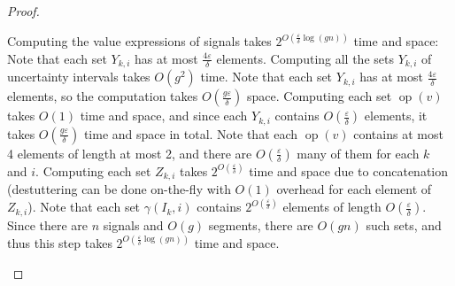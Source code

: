\begin{proof}
\begin{enumerate}
		
		Computing the value expressions of signals takes $2^{O(\frac{\varepsilon}{\delta}  \log(gn))}$ time and space:
		Note that each set $Y_{k,i}$ has at most $\frac{4 \varepsilon}{\delta}$ elements. %
		Computing all the sets $Y_{k,i}$ of uncertainty intervals takes $O(g^2)$ time.
		Note that each set $Y_{k,i}$ has at most $\frac{4 \varepsilon}{\delta}$ elements, so the computation takes $O(\frac{g \varepsilon}{\delta})$ space.
		Computing each set $\operatorname{op}(v)$ takes $O(1)$ time and space, and since each $Y_{k,i}$ contains $O(\frac{\varepsilon}{\delta})$ elements, it takes $O(\frac{g \varepsilon}{\delta})$ time and space in total.
		Note that each $\operatorname{op}(v)$ contains at most 4 elements of length at most 2, and there are $O(\frac{\varepsilon}{\delta})$ many of them for each $k$ and $i$.
		Computing each set $Z_{k,i}$ takes $2^{O(\frac{\varepsilon}{\delta})}$ time and space due to concatenation (destuttering can be done on-the-fly with $O(1)$ overhead for each element of $Z_{k,i}$).
		Note that each set $\gamma(I_k, i)$ contains $2^{O(\frac{\varepsilon}{\delta})}$ elements of length $O(\frac{\varepsilon}{\delta})$.
		Since there are $n$ signals and $O(g)$ segments, there are $O(gn)$ such sets, and thus this step takes $2^{O(\frac{\varepsilon}{\delta}  \log(gn))}$ time and space. 
	
		

\end{enumerate}
\end{proof}
